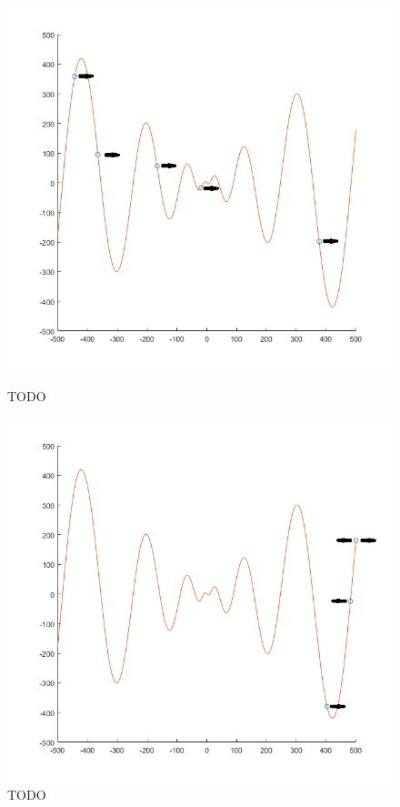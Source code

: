 \documentclass[a4paper,12pt,titlepage]{article}
\begin{document}
\begin{figure}[!ht]
\centering
\begin{minipage}{.5\textwidth}
  \centering
  \includegraphics[width=\textwidth]{1.png}
  \caption{TODO}
  \label{fig:1}
\end{minipage}%
\begin{minipage}{.5\textwidth}
  \centering
  \includegraphics[width=\textwidth]{2.png}
  \caption{TODO}
  \label{fig:2}
\end{minipage}
\end{figure}
\end{document}
